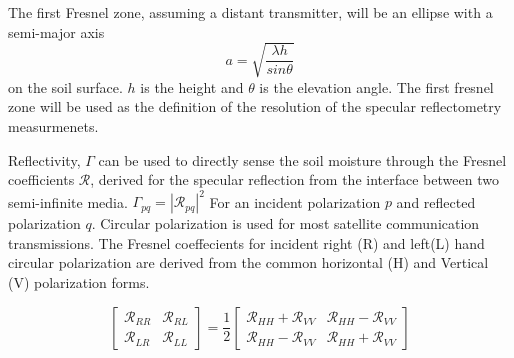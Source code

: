 \documentclass[draftcls,onecolumn]{IEEEtran}  %
\begin{document}

The first Fresnel zone, assuming a distant transmitter, will be an ellipse with a semi-major axis  
\begin{equation}
    a =\sqrt{\frac{\lambda h}{sin\theta} } 
     \label{Eq: Fresnel_zone_reduce}
\end{equation}
on the soil surface.
$h$ is the height and $\theta$ is the elevation angle.
The first fresnel zone will be used as the definition of the resolution of the specular reflectometry measurmenets. 




Reflectivity, $\Gamma$ can be used to directly sense the soil moisture through the   Fresnel  coefficients $\mathcal{R}$, derived for the specular reflection from the interface between two semi-infinite media.
$\Gamma_{pq} = |\mathcal{R}_{pq}|^2$ 
For an incident polarization $p$ and reflected polarization $q$. 
Circular polarization is used for most satellite communication transmissions.  The Fresnel coeffecients for incident right (R) and left(L) hand circular polarization are derived from the common horizontal (H) and Vertical (V) polarization forms. 

\begin{equation}
	\begin{bmatrix}
	\mathcal{R}_{RR} & \mathcal{R}_{RL} \\
	\mathcal{R}_{LR} & \mathcal{R}_{LL}
	\end{bmatrix} = 
	\frac{1}{2}
	\begin{bmatrix}
	\mathcal{R}_{HH} + \mathcal{R}_{VV} & \mathcal{R}_{HH} - \mathcal{R}_{VV} \\
	\mathcal{R}_{HH} - \mathcal{R}_{VV} & \mathcal{R}_{HH} + \mathcal{R}_{VV}		\end{bmatrix}
\end{equation}
\end{document}
